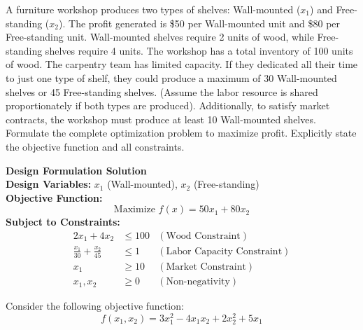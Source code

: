 \documentclass[12pt]{exam}
\begin{document}
	\begin{questions}
        \addpoints
    

            \question[8] A furniture workshop produces two types of shelves: Wall-mounted ($x_1$) and Free-standing ($x_2$). The profit generated is \$50 per Wall-mounted unit and \$80 per Free-standing unit. Wall-mounted shelves require 2 units of wood, while Free-standing shelves require 4 units. The workshop has a total inventory of 100 units of wood. The carpentry team has limited capacity. If they dedicated all their time to just one type of shelf, they could produce a maximum of 30 Wall-mounted shelves or 45 Free-standing shelves. (Assume the labor resource is shared proportionately if both types are produced). Additionally, to satisfy market contracts, the workshop must produce at least 10 Wall-mounted shelves. Formulate the complete optimization problem to maximize profit. Explicitly state the objective function and all constraints.
            \item \textbf{Design Formulation Solution} \\
            \textbf{Design Variables:} $x_1$ (Wall-mounted), $x_2$ (Free-standing) \\
            \textbf{Objective Function:}
            \[ \text{Maximize } f(x) = 50x_1 + 80x_2 \]
            \textbf{Subject to Constraints:}
            \begin{align*}
                2x_1 + 4x_2 &\le 100 & (\text{Wood Constraint}) \\
                \frac{x_1}{30} + \frac{x_2}{45} &\le 1 & (\text{Labor Capacity Constraint}) \\
                x_1 &\ge 10 & (\text{Market Constraint}) \\
                x_1, x_2 &\ge 0 & (\text{Non-negativity})
            \end{align*}
           
             Consider the following objective function:
            \[ f(x_1, x_2) = 3x_1^2 - 4x_1x_2 + 2x_2^2 + 5x_1 \]
            
\end{questions}
\end{document}
